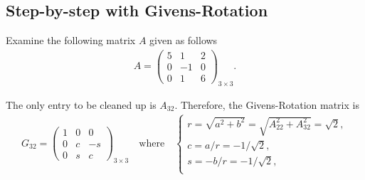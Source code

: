 \documentclass[12pt]{article}
\begin{document}
\subsection{Step-by-step with Givens-Rotation}
\begin{exampleboxed}
	Examine the following matrix $A$ given as follows
	\begin{align}
		A = \begin{pmatrix} 5 &1 &2 \\ 0 &-1 &0 \\ 0 &1 &6 \end{pmatrix}_{3\times 3}.
	\end{align}
\end{exampleboxed}
The only entry to be cleaned up is $A_{32}$. Therefore, the Givens-Rotation matrix is 
\begin{align}
	G_{32} = \begin{pmatrix}  1 &0 &0 \\ 0 &c &-s \\ 0 &s &c \end{pmatrix}_{3\times 3}
	\quad
	\text{where}
	\quad
	\begin{cases}
		r = \sqrt{a^2+b^2} = \sqrt{A_{22}^2 + A_{32}^2} = \sqrt{2}, \\
		c =  a/r = -1/\sqrt{2},                                     \\
		s = -b/r = -1/\sqrt{2},                                     \\
	\end{cases}
\end{align}
\end{document}
